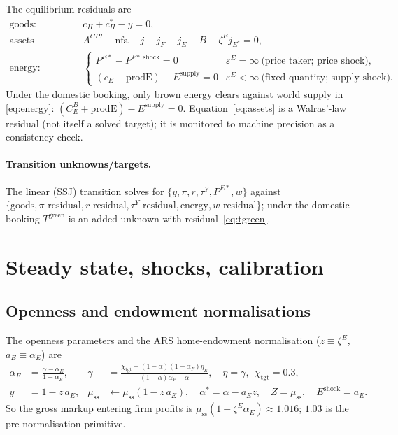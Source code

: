 \documentclass[11pt]{article}
\newcommand{\stst}{\mathrm{ss}}
\begin{document}
The equilibrium residuals are
\begin{align}
\text{goods:}&\quad c_H+c_H^{*}-y=0, \label{eq:goods}\\
\text{assets (Walras):}&\quad A^{CPI}-\mathrm{nfa}-j-j_F-j_E-B-\zeta^{E}j_{E^{*}}=0, \label{eq:assets}\\
\text{energy:}&\quad
\begin{cases}
P^{E*}-P^{E*,\text{shock}}=0 & \varepsilon^{E}=\infty\ \text{(price taker; price shock)},\\
(c_E+\mathrm{prodE})-E^{\text{supply}}=0 & \varepsilon^{E}<\infty\ \text{(fixed quantity; supply shock).}
\end{cases}\label{eq:energy}
\end{align}
Under the domestic booking, only brown energy clears against world supply in
\eqref{eq:energy}: $(C^{B}_{E}+\mathrm{prodE})-E^{\text{supply}}=0$.
Equation~\eqref{eq:assets} is a Walras'-law residual (not itself a solved
target); it is monitored to machine precision as a consistency check.

\paragraph{Transition unknowns/targets.} The linear (SSJ) transition solves for
$\{y,\pi,r,\tau^{Y},P^{E*},w\}$ against
$\{\text{goods}, \text{$\pi$ residual}, r\text{ residual}, \tau^{Y}\text{ residual},
\text{energy}, w\text{ residual}\}$; under the domestic booking $T^{\text{green}}$
is an added unknown with residual~\eqref{eq:tgreen}.

\section{Steady state, shocks, calibration}\label{sec:ss}

\subsection{Openness and endowment normalisations}

The openness parameters and the ARS home-endowment normalisation
($z\equiv\zeta^{E}$, $a_E\equiv\alpha_E$) are
\begin{align}
\alpha_F&=\frac{\alpha-\alpha_E}{1-\alpha_E}, &
\gamma&=\frac{\chi_{\text{tgt}}-(1-\alpha)(1-\alpha_F)\eta_E}{(1-\alpha)\alpha_F+\alpha},\quad \eta=\gamma,\ \ \chi_{\text{tgt}}=0.3,\\
y&=1-z\,a_E, & \mu_{\stst}&\leftarrow\mu_{\stst}(1-z\,a_E),\quad
\alpha^{*}=\alpha-a_E z,\quad Z=\mu_{\stst},\quad E^{\text{shock}}=a_E .
\end{align}
So the gross markup entering firm profits is $\mu_{\stst}(1-\zeta^{E}\alpha_E)\approx 1.016$;
$1.03$ is the pre-normalisation primitive.
\end{document}
